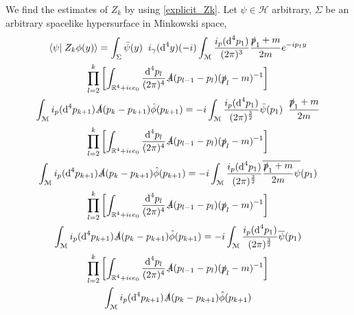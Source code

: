 \documentclass[b5paper,draft,openbib,12pt]{memoir}
\begin{document}
We find the estimates of \(Z_k\) by using \eqref{explicit_Zk}. Let \(\psi \in \mathcal{H}\) arbitrary, \(\Sigma\) be an arbitrary spacelike hypersurface in Minkowski space,
\begin{multline*}
\left<\psi\right| \left. Z_k\phi(y)\right>= \int_{\Sigma} \bar{\psi}(y)\hspace{0.2cm} i_{\gamma} (\text{d}^4 y) (- i)  \int_{\mathcal{M}}\frac{i_p(\text{d}^4p_1)}{(2\pi)^{3}} \frac{\slashed{p}_1+m}{2m} e^{-ip_1y}  \\
  \prod_{l=2}^{k} \left[ \int_{\mathbb{R}^4+i \epsilon e_0}\frac{\text{d}^4p_l}{(2\pi)^{4}} \slashed{A}(p_{l-1}-p_l)  (\slashed{p}_l-m)^{-1}  
 \right]\\
 \int_{\mathcal{M}}  i_p(\text{d}^4p_{k+1})\slashed{A}(p_{k}-p_{k+1})\hat{\phi}(p_{k+1})
 =  - i  \int_{\mathcal{M}}\frac{i_p(\text{d}^4p_1)}{(2\pi)^{\frac{3}{2}}}\bar{\psi}(p_1)\hspace{0.2cm}  \frac{\slashed{p}_1+m}{2m}   \\
  \prod_{l=2}^{k} \left[ \int_{\mathbb{R}^4+i \epsilon e_0}\frac{\text{d}^4p_l}{(2\pi)^{4}} \slashed{A}(p_{l-1}-p_l)  (\slashed{p}_l-m)^{-1}  
 \right]\\
 \int_{\mathcal{M}}  i_p(\text{d}^4p_{k+1})\slashed{A}(p_{k}-p_{k+1})\hat{\phi}(p_{k+1})
  =  - i  \int_{\mathcal{M}}\frac{i_p(\text{d}^4p_1)}{(2\pi)^{\frac{3}{2}}}\overline{ \frac{\slashed{p}_1+m}{2m}\psi}(p_1)   \\
  \prod_{l=2}^{k} \left[ \int_{\mathbb{R}^4+i \epsilon e_0}\frac{\text{d}^4p_l}{(2\pi)^{4}} \slashed{A}(p_{l-1}-p_l)  (\slashed{p}_l-m)^{-1}  
 \right]\\
 \int_{\mathcal{M}}  i_p(\text{d}^4p_{k+1})\slashed{A}(p_{k}-p_{k+1})\hat{\phi}(p_{k+1})
   =  - i  \int_{\mathcal{M}}\frac{i_p(\text{d}^4p_1)}{(2\pi)^{\frac{3}{2}}}\overline{\psi}(p_1)   \\
  \prod_{l=2}^{k} \left[ \int_{\mathbb{R}^4+i \epsilon e_0}\frac{\text{d}^4p_l}{(2\pi)^{4}} \slashed{A}(p_{l-1}-p_l)  (\slashed{p}_l-m)^{-1}  
 \right]\\
 \int_{\mathcal{M}}  i_p(\text{d}^4p_{k+1})\slashed{A}(p_{k}-p_{k+1})\hat{\phi}(p_{k+1})
\end{multline*}
\end{document}
